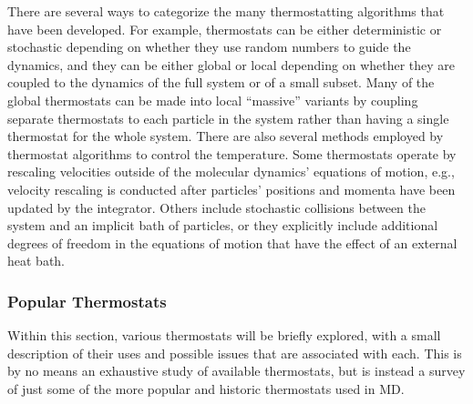 \documentclass[9pt,bestpractices]{livecoms}
\begin{document}
There are several ways to categorize the many thermostatting algorithms that have been developed.
For example, thermostats can be either deterministic or stochastic depending on whether they use random numbers to guide the dynamics, and they can be either global or local depending on whether they are coupled to the dynamics of the full system or of a small subset.
Many of the global thermostats can be made into local ``massive'' variants by coupling separate thermostats to each particle in the system rather than having a single thermostat for the whole system.
There are also several methods employed by thermostat algorithms to control the temperature.
Some thermostats operate by rescaling velocities outside of the molecular dynamics' equations of motion, e.g., velocity rescaling is conducted after particles' positions and momenta have been updated by the integrator.
Others include stochastic collisions between the system and an implicit bath of particles, or they explicitly include additional degrees of freedom in the equations of motion that have the effect of an external heat bath.

\subsubsection{Popular Thermostats}
Within this section, various thermostats will be briefly explored, with a small description of their uses and possible issues that are associated with each.
This is by no means an exhaustive study of available thermostats, but is instead a survey of just some of the more popular and historic thermostats used in MD.
\end{document}

